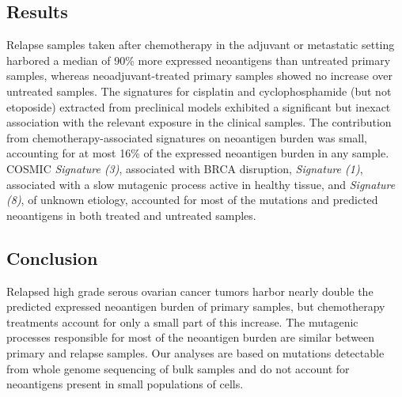 \subsection*{Results}
Relapse samples taken after chemotherapy in the adjuvant or metastatic setting harbored a median of 90\% more expressed neoantigens than untreated primary samples, whereas neoadjuvant-treated primary samples showed no increase over untreated samples. The signatures for cisplatin and cyclophosphamide (but not etoposide) extracted from preclinical models exhibited a significant but inexact association with the relevant exposure in the clinical samples. The contribution from chemotherapy-associated signatures on neoantigen burden was small, accounting for at most 16\% of the expressed neoantigen burden in any sample. COSMIC \textit{Signature (3)}, associated with BRCA disruption, \textit{Signature (1)}, associated with a slow mutagenic process active in healthy tissue, and \textit{Signature (8)}, of unknown etiology, accounted for most of the mutations and predicted neoantigens in both treated and untreated samples. 

\subsection*{Conclusion}
Relapsed high grade serous ovarian cancer tumors harbor nearly double the predicted expressed neoantigen burden of primary samples, but chemotherapy treatments account for only a small part of this increase. The mutagenic processes responsible for most of the neoantigen burden are similar between primary and relapse samples. Our analyses are based on mutations detectable from whole genome sequencing of bulk samples and do not account for neoantigens present in small populations of cells. 



